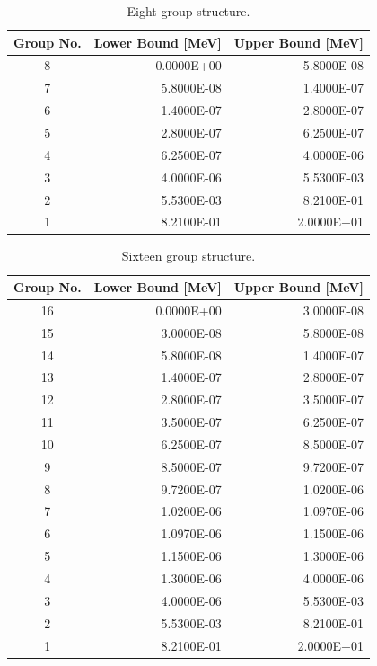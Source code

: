 \begin{appendices}
\begin{table}[h!]
  \centering
  \footnotesize
  \caption{Eight group structure.}
  \label{table:app-8-groups} 
  \vspace{14pt}
  \begin{tabular}{c r r}
    \toprule
    {\bf Group No.} &
    {\bf Lower Bound [MeV]} &
    {\bf Upper Bound [MeV]} \\
    \midrule
8 & 0.0000E+00 & 5.8000E-08 \\
7 & 5.8000E-08 & 1.4000E-07 \\
6 & 1.4000E-07 & 2.8000E-07 \\
5 & 2.8000E-07 & 6.2500E-07 \\
4 & 6.2500E-07 & 4.0000E-06 \\
3 & 4.0000E-06 & 5.5300E-03 \\
2 & 5.5300E-03 & 8.2100E-01 \\
1 & 8.2100E-01 & 2.0000E+01 \\
  \bottomrule
 \end{tabular}
\end{table}

\begin{table}[h!]
  \centering
  \footnotesize
  \caption{Sixteen group structure.}
  \label{table:app-16-groups} 
  \vspace{14pt}
  \begin{tabular}{c r r}
    \toprule
    {\bf Group No.} &
    {\bf Lower Bound [MeV]} &
    {\bf Upper Bound [MeV]} \\
    \midrule
16 & 0.0000E+00 & 3.0000E-08 \\
15 & 3.0000E-08 & 5.8000E-08 \\
14 & 5.8000E-08 & 1.4000E-07 \\
13 & 1.4000E-07 & 2.8000E-07 \\
12 & 2.8000E-07 & 3.5000E-07 \\
11 & 3.5000E-07 & 6.2500E-07 \\
10 & 6.2500E-07 & 8.5000E-07 \\
9 & 8.5000E-07 & 9.7200E-07 \\
8 & 9.7200E-07 & 1.0200E-06 \\
7 & 1.0200E-06 & 1.0970E-06 \\
6 & 1.0970E-06 & 1.1500E-06 \\
5 & 1.1500E-06 & 1.3000E-06 \\
4 & 1.3000E-06 & 4.0000E-06 \\
3 & 4.0000E-06 & 5.5300E-03 \\
2 & 5.5300E-03 & 8.2100E-01 \\
1 & 8.2100E-01 & 2.0000E+01 \\
  \bottomrule
 \end{tabular}
\end{table}


\end{appendices}
